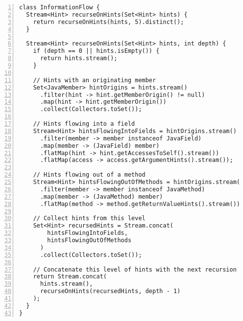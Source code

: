 \clearpage
\begin{lstlisting}[caption={Constraint 7: InformationFlow class used to recursively follow hints to their originating members. For hints originating from fields, we check all hints that flow into said field. For hints originating from methods, we check all hints that flow into the return value of the method. This process is repeated until the "breadcrumb trail" of hints is exhausted, or to a maximum of 5 recursive steps.}, captionpos=b, label=lst:constraint_7_flow, numbers=left, showstringspaces=false]
class InformationFlow {
  Stream<Hint> recurseOnHints(Set<Hint> hints) {
    return recurseOnHints(hints, 5).distinct();
  }

  Stream<Hint> recurseOnHints(Set<Hint> hints, int depth) {
    if (depth == 0 || hints.isEmpty()) {
      return hints.stream();
    }

    // Hints with an originating member
    Set<JavaMember> hintOrigins = hints.stream()
      .filter(hint -> hint.getMemberOrigin() != null)
      .map(hint -> hint.getMemberOrigin())
      .collect(Collectors.toSet());

    // Hints flowing into a field
    Stream<Hint> hintsFlowingIntoFields = hintOrigins.stream()
      .filter(member -> member instanceof JavaField)
      .map(member -> (JavaField) member)
      .flatMap(hint -> hint.getAccessesToSelf().stream())
      .flatMap(access -> access.getArgumentHints().stream());

    // Hints flowing out of a method
    Stream<Hint> hintsFlowingOutOfMethods = hintOrigins.stream()
      .filter(member -> member instanceof JavaMethod)
      .map(member -> (JavaMethod) member)
      .flatMap(method -> method.getReturnValueHints().stream());

    // Collect hints from this level
    Set<Hint> recursedHints = Stream.concat(
        hintsFlowingIntoFields, 
        hintsFlowingOutOfMethods
      )
      .collect(Collectors.toSet());

    // Concatenate this level of hints with the next recursion level
    return Stream.concat(
      hints.stream(),
      recurseOnHints(recursedHints, depth - 1)
    );
  }
}
\end{lstlisting}